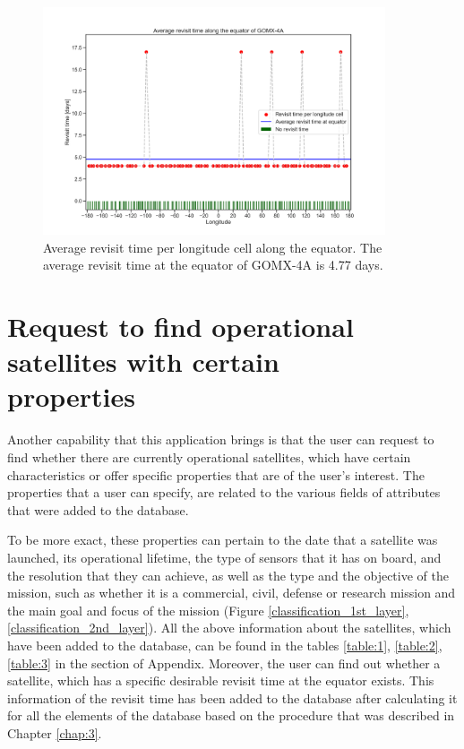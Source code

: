 \begin{figure}
\centering
\includegraphics[width=0.9\textwidth]{Images/revisit_time_of_GOMX-4A.png}
\caption{Average revisit time per longitude cell along the equator. The average revisit time at the equator of GOMX-4A is 4.77 days.}
\label{revisit_time_of_GOMX-4A}
\end{figure}

\bigskip
\section{Request to find operational satellites with certain \\properties}
\bigskip

Another capability that this application brings is that the user can request to find whether there are currently operational satellites, which have certain characteristics or offer specific properties that are of the user's interest. The properties that a user can specify, are related to the various fields of attributes that were added to the database.

To be more exact, these properties can pertain to the date that a satellite was launched, its operational lifetime, the type of sensors that it has on board, and the resolution that they can achieve, as well as the type and the objective of the mission, such as whether it is a commercial, civil, defense or research mission and the main goal and focus of the mission (Figure \ref{classification_1st_layer}, \ref{classification_2nd_layer}). All the above information about the satellites, which have been added to the database, can be found in the tables \ref{table:1}, \ref{table:2}, \ref{table:3} in the section of Appendix. Moreover, the user can find out whether a satellite, which has a specific desirable revisit time at the equator exists. This information of the revisit time has been added to the database after calculating it for all the elements of the database based on the procedure that was described in Chapter \ref{chap:3}.

